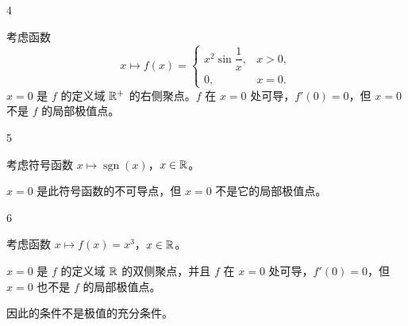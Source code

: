 \begin{sourceexample}{4}

考虑函数
\[x\longmapsto f(x)=\begin{cases} x^2\sin\dfrac{1}{x}, & x>0,\\[1ex] 0, & x=0. \end{cases}\]
$x=0$ 是 $f$ 的定义域 $\mathbb{R}^+$ 的右侧聚点。$f$ 在 $x=0$ 处可导，$f'(0)=0$，但 $x=0$ 不是 $f$ 的局部极值点。

\end{sourceexample}

\begin{sourceexample}{5}

考虑符号函数 $x\longmapsto\operatorname{sgn}(x)$，$x\in\mathbb{R}$。

$x=0$ 是此符号函数的不可导点，但 $x=0$ 不是它的局部极值点。

\end{sourceexample}

\begin{sourceexample}{6}

考虑函数 $x\longmapsto f(x)=x^3$，$x\in\mathbb{R}$。

$x=0$ 是 $f$ 的定义域 $\mathbb{R}$ 的双侧聚点，并且 $f$ 在 $x=0$ 处可导，$f'(0)=0$，但 $x=0$ 也不是 $f$ 的局部极值点。

\end{sourceexample}

因此的条件不是极值的充分条件。

